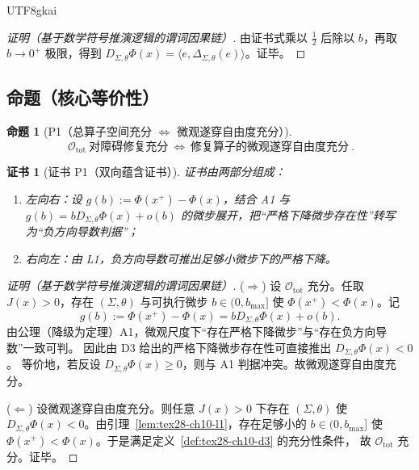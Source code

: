 \documentclass[12pt]{article}
\newtheorem{proposition}{命题}[section]
\newtheorem{Certificate}{证书}[section]
\begin{document}
\begin{CJK*}{UTF8}{gkai}
\begin{proof}[证明（基于数学符号推演逻辑的谓词因果链）]
由证书式乘以 $\frac12$ 后除以 $b$，再取 $b\to0^+$ 极限，得到
$D_{\Sigma,\theta}\Phi(x)=\langle e,\Delta_{\Sigma,\theta}(e)\rangle$。证毕。
\end{proof}

\subsection{命题（核心等价性）}
\label{subsec:tex28-ch10-props}

\begin{proposition}[P1（总算子空间充分 $\Longleftrightarrow$ 微观遂穿自由度充分）]
\label{prop:tex28-ch10-p1}
\[
  \boxed{\ \mathcal{O}_{\mathrm{tot}}\ \text{对障碍修复充分}\ }
  \Longleftrightarrow
  \boxed{\ \text{修复算子的微观遂穿自由度充分}\ }.
\]
\end{proposition}

\begin{Certificate}[证书 P1（双向蕴含证书）]
\label{cert:tex28-ch10-p1}
证书由两部分组成：
\begin{enumerate}
  \item 左向右：设 $g(b):=\Phi(x^+)-\Phi(x)$，结合 A1 与
  $g(b)=bD_{\Sigma,\theta}\Phi(x)+o(b)$ 的微步展开，把“严格下降微步存在性”转写为“负方向导数判据”；
  \item 右向左：由 L1，负方向导数可推出足够小微步下的严格下降。
\end{enumerate}
\end{Certificate}

\begin{proof}[证明（基于数学符号推演逻辑的谓词因果链）]
($\Rightarrow$) 设 $\mathcal{O}_{\mathrm{tot}}$ 充分。任取 $J(x)>0$，存在 $(\Sigma,\theta)$ 与可执行微步
$b\in(0,b_{\max}]$ 使 $\Phi(x^+)<\Phi(x)$。记
\[
  g(b):=\Phi(x^+)-\Phi(x)=bD_{\Sigma,\theta}\Phi(x)+o(b).
\]
由公理（降级为定理）A1，微观尺度下“存在严格下降微步”与“存在负方向导数”一致可判。
因此由 D3 给出的严格下降微步存在性可直接推出 $D_{\Sigma,\theta}\Phi(x)<0$。
等价地，若反设 $D_{\Sigma,\theta}\Phi(x)\ge0$，则与 A1 判据冲突。故微观遂穿自由度充分。

($\Leftarrow$) 设微观遂穿自由度充分。则任意 $J(x)>0$ 下存在 $(\Sigma,\theta)$ 使
$D_{\Sigma,\theta}\Phi(x)<0$。由引理~\ref{lem:tex28-ch10-l1}，存在足够小的
$b\in(0,b_{\max}]$ 使 $\Phi(x^+)<\Phi(x)$。于是满足定义~\ref{def:tex28-ch10-d3} 的充分性条件，
故 $\mathcal{O}_{\mathrm{tot}}$ 充分。证毕。
\end{proof}


\end{CJK*}
\end{document}

